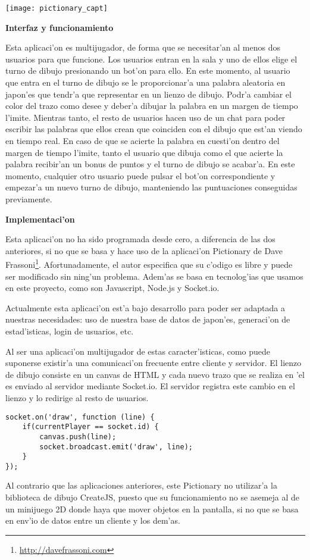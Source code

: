 \begin{center}
\texttt{[image: pictionary\_capt]}
\end{center}

\textbf{Interfaz y funcionamiento}

Esta aplicaci'on es multijugador, de forma que se necesitar'an al menos dos usuarios para que funcione. Los usuarios entran en la sala
y uno de ellos elige el turno de dibujo presionando un bot'on para ello. En este momento, al usuario que entra en el turno de dibujo
se le proporcionar'a una palabra aleatoria en japon'es que tendr'a que representar en un lienzo de dibujo. Podr'a cambiar el color
del trazo como desee y deber'a dibujar la palabra en un margen de tiempo l'imite. Mientras tanto, el resto de usuarios hacen uso
de un chat para poder escribir las palabras que ellos crean que coinciden con el dibujo que est'an viendo en tiempo real. En caso de
que se acierte la palabra en cuesti'on dentro del margen de tiempo l'imite, tanto el usuario que dibuja como el que acierte la
palabra recibir'an un bonus de puntos y el turno de dibujo se acabar'a. En este momento, cualquier otro usuario puede pulsar el
bot'on correspondiente y empezar'a un nuevo turno de dibujo, manteniendo las puntuaciones conseguidas previamente.

\textbf{Implementaci'on}

Esta aplicaci'on no ha sido programada desde cero, a diferencia de las dos anteriores, si no que se basa y hace uso de la aplicaci'on
Pictionary de Dave Frassoni\footnote{\url{http://davefrassoni.com}}. Afortunadamente, el autor especifica que su c'odigo es libre y puede ser modificado sin ning'un problema.
Adem'as se basa en tecnolog'ias que usamos en este proyecto, como son Javascript, Node.js y Socket.io.

Actualmente esta aplicaci'on est'a bajo desarrollo para poder ser adaptada a nuestras necesidades: uso de nuestra base de datos de japon'es,
generaci'on de estad'isticas, login de usuarios, etc.

Al ser una aplicaci'on multijugador de estas caracter'isticas, como puede suponerse existir'a una comunicaci'on frecuente entre cliente y
servidor. El lienzo de dibujo consiste en un canvas de HTML y cada nuevo trazo que se realiza en 'el es enviado al servidor mediante
Socket.io. El servidor registra este cambio en el lienzo y lo redirige al resto de usuarios.

\vspace{3em}
\begin{verbatim}
socket.on('draw', function (line) {
	if(currentPlayer == socket.id) {
		canvas.push(line);
		socket.broadcast.emit('draw', line);
	}
});
\end{verbatim}

Al contrario que las aplicaciones anteriores, este Pictionary no utilizar'a la biblioteca de dibujo CreateJS, puesto que su funcionamiento
no se asemeja al de un minijuego 2D donde haya que mover objetos en la pantalla, si no que se basa en env'io de datos entre un cliente y los dem'as.
